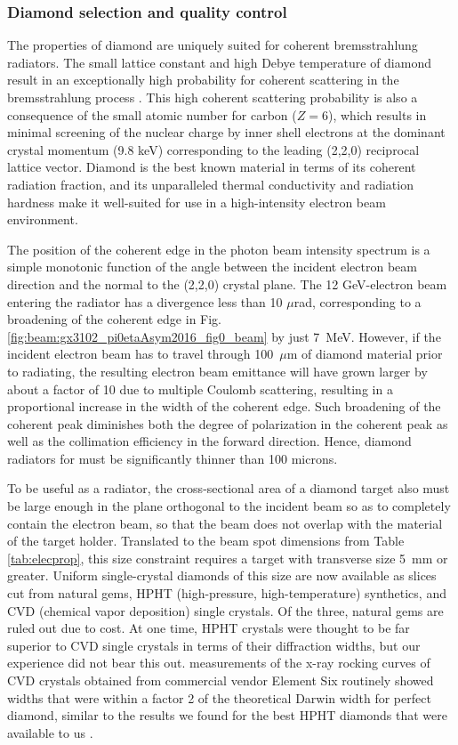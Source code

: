 \subsubsection{Diamond selection and quality control \label{sec:diamonds}}
The properties of diamond are uniquely suited for coherent brems\-strah\-lung radiators.
The small lattice constant and high Debye temperature of diamond result in an exceptionally high probability
for coherent scattering in the brems\-strah\-lung process \cite{Bilokon:1983}.
This high coherent scattering probability is also a consequence of the small
atomic number for carbon ($Z=6$), which results in minimal screening of 
the nuclear charge by inner shell electrons at the
dominant crystal momentum (9.8 keV) corresponding to the leading (2,2,0) reciprocal lattice vector.
Diamond is the best known material in terms of its coherent radiation
fraction, and its unparalleled thermal conductivity and radiation hardness make it
well-suited for use in a high-intensity electron beam environment.

The position of the coherent edge in the photon beam intensity spectrum is a simple monotonic
function of the angle between the incident electron beam direction and the normal to the (2,2,0)
crystal plane. The 12 GeV-electron beam entering the radiator has a divergence less than
10 $\mu$rad, corresponding to a broadening of the coherent edge in
Fig.\,\ref{fig:beam:gx3102_pi0etaAsym2016_fig0_beam} by just 7~MeV. However, if the 
incident electron beam has 
to travel through 100~$\mu$m of diamond material prior to radiating, the
resulting electron beam emittance will have
grown larger by about a factor of 10 due to multiple Coulomb scattering, resulting in a proportional increase
in the width of the coherent edge. Such broadening of the coherent peak diminishes both the degree of polarization in the coherent peak as well as the collimation efficiency in the forward direction.
Hence, diamond radiators for \GX{} must be significantly
thinner than 100 microns. 

To be useful as a radiator, the cross-sectional area of a diamond target also must be large enough in the plane orthogonal to the incident beam so as to
completely contain the electron beam, so that the beam does not overlap with the material of
the target holder. Translated to the beam spot dimensions from Table\,\ref{tab:elecprop}, this size constraint
requires a target with transverse size 5~mm or greater. Uniform single-crystal diamonds of
this size are now available as slices cut from natural gems, HPHT (high-pressure, 
high-temperature) synthetics, and CVD (chemical vapor deposition) single crystals. Of the
three, natural gems are ruled out due to cost. At one time, HPHT crystals were thought
to be far superior to CVD single crystals in terms of their diffraction widths, but our
experience did not bear this out. \GX{} measurements of the
x-ray rocking curves of CVD crystals obtained from commercial vendor Element Six routinely
showed widths that were within a factor 2 of the theoretical Darwin width for perfect diamond,
similar to the results we found for the best HPHT diamonds that were available to us
\cite{YANG2010719,YANG2012}.

